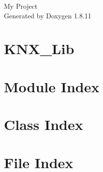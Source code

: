 \documentclass[twoside]{book}
\newcommand{\+}{\discretionary{\mbox{\scriptsize$\hookleftarrow$}}{}{}}
\newcommand{\clearemptydoublepage}{%
  \newpage{\pagestyle{empty}\cleardoublepage}%
}
\begin{document}
\hypersetup{pageanchor=false,
             bookmarksnumbered=true,
             pdfencoding=unicode
            }
\begin{titlepage}
\vspace*{7cm}
\begin{center}%
{\Large My Project }\\
\vspace*{1cm}
{\large Generated by Doxygen 1.8.11}\\
\end{center}
\end{titlepage}
\clearemptydoublepage
\tableofcontents
\clearemptydoublepage
{}
\hypersetup{pageanchor=true}

\chapter{K\+N\+X\+\_\+\+Lib}
\label{md_README}
\hypertarget{md_README}{}

\chapter{Module Index}

\chapter{Class Index}

\chapter{File Index}

\end{document}
